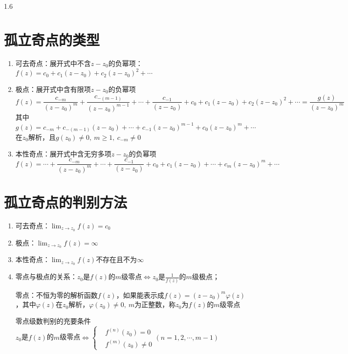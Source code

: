 \documentclass[lang=cn,10pt]{elegantbook}
\begin{document}
\begin{spacing}{1.6}
\section{孤立奇点的类型}
\begin{enumerate}
    \item 可去奇点：展开式中不含$z-z_0$的负幂项：$f\left(z\right)=c_0+c_1\left(z-z_0\right)+c_2\left(z-z_0\right)^2+\cdots$
    \item 极点：展开式中含有限项$z-z_0$的负幂项
    $$f\left(z\right)=\frac{c_{-m}}{\left(z-z_0\right)^{m}}+\frac{c_{-\left(m-1\right)}}{\left(z-z_0\right)^{m-1}}+\cdots+\frac{c_{-1}}{\left(z-z_0\right)}+c_0+c_1\left(z-z_0\right)+c_2\left(z-z_0\right)^2+\cdots=\frac{g\left(z\right)}{\left(z-z_0\right)^m}$$
    其中$g\left(z\right)=c_{-m}+c_{-\left(m-1\right)}\left(z-z_0\right)+\cdots+c_{-1}\left(z-z_0\right)^{m-1}+c_0\left(z-z_0\right)^m+\cdots$在$z_0$解析，且$g\left(z_0\right)\neq 0,\ m\geq 1,\ c_{-m}\neq 0$
    \item 本性奇点：展开式中含无穷多项$z-z_0$的负幂项
    $$f\left(z\right)=\cdots+\frac{c_{-m}}{\left(z-z_0\right)^m}+\cdots+\frac{c_{-1}}{\left(z-z_0\right)}+c_0+c_1\left(z-z_0\right)+\cdots+c_m\left(z-z_0\right)^m+\cdots$$
\end{enumerate}
\section{孤立奇点的判别方法}
\begin{enumerate}
    \item 可去奇点：$\lim_{z\to z_0}f\left(z\right)=c_0$
    \item 极点：$\lim_{z\to z_0}f\left(z\right)=\infty$
    \item 本性奇点：$\lim_{z\to z_0}f\left(z\right)$不存在且不为$\infty$
    \item 零点与极点的关系：$z_0$是$f\left(z\right)$的$m$级零点$\Longleftrightarrow z_0$是$\frac{1}{f\left(z\right)}$的$m$级极点；
    \begin{definition}
    零点：不恒为零的解析函数$f\left(z\right)$，如果能表示成$f\left(z\right)=\left(z-z_0\right)^m\varphi\left(z\right)$，其中$\varphi\left(z\right)$在$z_0$解析，$\varphi\left(z_0\right)\neq 0,\ m$为正整数，称$z_0$为$f\left(z\right)$的$m$级零点
    \end{definition}
    \begin{theorem}
    零点级数判别的充要条件\\
    $z_0$是$f\left(z\right)$的$m$级零点$\Longleftrightarrow
    \left\{
    \begin{aligned}
    &f^{\left(n\right)}\left(z_0\right)=0\\
    &f^{\left(m\right)}\left(z_0\right)\neq 0
    \end{aligned}
    \right.(n=1,2,\cdots,m-1)
    $
    \end{theorem}
\end{enumerate}

\end{spacing}
\end{document}
